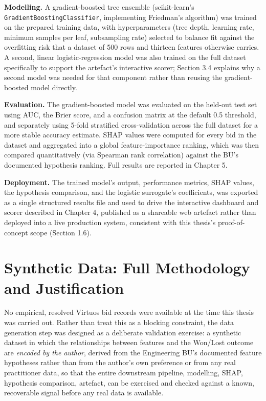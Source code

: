 \documentclass[12pt,oneside]{report}
\begin{document}
\textbf{Modelling.} A gradient-boosted tree ensemble (scikit-learn's
\texttt{GradientBoostingClassifier}, implementing Friedman's
\citeyearpar{friedman2001greedy} algorithm) was trained on the prepared
training data, with hyperparameters (tree depth, learning rate, minimum
samples per leaf, subsampling rate) selected to balance fit against the
overfitting risk that a dataset of 500 rows and thirteen features
otherwise carries. A second, linear logistic-regression model was also
trained on the full dataset specifically to support the artefact's
interactive scorer; Section 3.4 explains why a second model was needed
for that component rather than reusing the gradient-boosted model
directly.

\textbf{Evaluation.} The gradient-boosted model was evaluated on the
held-out test set using AUC, the Brier score, and a confusion matrix at
the default 0.5 threshold, and separately using 5-fold stratified
cross-validation across the full dataset for a more stable accuracy
estimate. SHAP values were computed for every bid in the dataset and
aggregated into a global feature-importance ranking, which was then
compared quantitatively (via Spearman rank correlation) against the BU's
documented hypothesis ranking. Full results are reported in Chapter 5.

\textbf{Deployment.} The trained model's output, performance metrics,
SHAP values, the hypothesis comparison, and the logistic surrogate's
coefficients, was exported as a single structured results file and used
to drive the interactive dashboard and scorer described in Chapter 4,
published as a shareable web artefact rather than deployed into a live
production system, consistent with this thesis's proof-of-concept scope
(Section 1.6).

\hypertarget{synthetic-data-full-methodology-and-justification}{%
\section{Synthetic Data: Full Methodology and
Justification}\label{synthetic-data-full-methodology-and-justification}}

No empirical, resolved Virtuos bid records were available at the time
this thesis was carried out. Rather than treat this as a blocking
constraint, the data generation step was designed as a deliberate
validation exercise: a synthetic dataset in which the relationships
between features and the Won/Lost outcome are \emph{encoded by the
author}, derived from the Engineering BU's documented feature hypotheses
rather than from the author's own preference or from any real
practitioner data, so that the entire downstream pipeline, modelling,
SHAP, hypothesis comparison, artefact, can be exercised and checked
against a known, recoverable signal before any real data is available.
\end{document}
